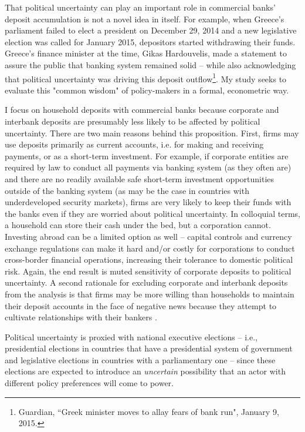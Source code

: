 \documentclass[12pt,a4paper]{article}
\begin{document}
That political uncertainty can play an important role in commercial banks' deposit accumulation is not a novel idea in itself. For example, when Greece's parliament failed to elect a president on December 29, 2014 and a new legislative election was called for January 2015, depositors started withdrawing their funds. Greece's finance minister at the time, Gikas Hardouvelis, made a statement to assure the public that banking system remained solid -- while also acknowledging that political uncertainty was driving this deposit outflow\footnote{Guardian, ``Greek minister moves to allay fears of bank run", January 9, 2015.}. My study seeks to evaluate this "common wisdom" of policy-makers in a formal, econometric way.

I focus on household deposits with commercial banks because corporate and interbank deposits are presumably less likely to be affected by political uncertainty. There are two main reasons behind this proposition. First, firms may use deposits primarily as current accounts, i.e. for making and receiving payments, or as a short-term investment. For example, if corporate entities are required by law to conduct all payments via banking system (as they often are) and there are no readily available safe short-term investment opportunities outside of the banking system (as may be the case in countries with underdeveloped security markets), firms are very likely to keep their funds with the banks even if they are worried about political uncertainty. In colloquial terms, a household can store their cash under the bed, but a corporation cannot. Investing abroad can be a limited option as well -- capital controls and currency exchange regulations can make it hard and/or costly for corporations to conduct cross-border financial operations, increasing their tolerance to domestic political risk. Again, the end result is muted sensitivity of corporate deposits to political uncertainty. A second rationale for excluding corporate and interbank deposits from the analysis is that firms may be more willing than households to maintain their deposit accounts in the face of negative news because they attempt to cultivate relationships with their bankers \citep[see, for example,][]{petersen1994benefits}.

Political uncertainty is proxied with national executive elections -- i.e., presidential elections in countries that have a presidential system of government and legislative elections in countries with a parliamentary one -- since these elections are expected to introduce an \emph{uncertain} possibility that an actor with different policy preferences will come to power.
\end{document}

